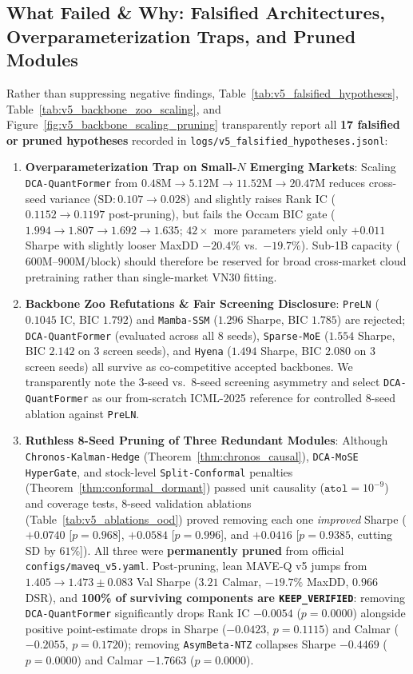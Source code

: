 \documentclass[11pt]{article}
\begin{document}
\subsection{What Failed \& Why: Falsified Architectures, Overparameterization Traps, and Pruned Modules}
\label{sec:v5_falsifications}
Rather than suppressing negative findings, Table~\ref{tab:v5_falsified_hypotheses}, Table~\ref{tab:v5_backbone_zoo_scaling}, and Figure~\ref{fig:v5_backbone_scaling_pruning} transparently report all \textbf{17 falsified or pruned hypotheses} recorded in \texttt{logs/v5\_falsified\_hypotheses.jsonl}:
\begin{enumerate}[leftmargin=1.4em]
  \item \textbf{Overparameterization Trap on Small-$N$ Emerging Markets}: Scaling \texttt{DCA-QuantFormer} from $0.48\text{M} \to 5.12\text{M} \to 11.52\text{M} \to 20.47\text{M}$ reduces cross-seed variance ($\text{SD}: 0.107 \to 0.028$) and slightly raises Rank IC ($0.1152 \to 0.1197$ post-pruning), but fails the Occam BIC gate ($1.994 \to 1.807 \to 1.692 \to 1.635$; $42\times$ more parameters yield only $+0.011$ Sharpe with slightly looser MaxDD $-20.4\%$ vs.\ $-19.7\%$). Sub-1B capacity ($600\text{M}$--$900\text{M}/\text{block}$) should therefore be reserved for broad cross-market cloud pretraining rather than single-market VN30 fitting.
  \item \textbf{Backbone Zoo Refutations \& Fair Screening Disclosure}: \texttt{PreLN} ($0.1045$ IC, BIC $1.792$) and \texttt{Mamba-SSM} ($1.296$ Sharpe, BIC $1.785$) are rejected; \texttt{DCA-QuantFormer} (evaluated across all 8 seeds), \texttt{Sparse-MoE} ($1.554$ Sharpe, BIC $2.142$ on 3 screen seeds), and \texttt{Hyena} ($1.494$ Sharpe, BIC $2.080$ on 3 screen seeds) all survive as co-competitive accepted backbones. We transparently note the 3-seed vs.\ 8-seed screening asymmetry and select \texttt{DCA-QuantFormer} as our from-scratch ICML-2025 reference for controlled 8-seed ablation against \texttt{PreLN}.
  \item \textbf{Ruthless 8-Seed Pruning of Three Redundant Modules}: Although \texttt{Chronos-Kalman-Hedge} (Theorem~\ref{thm:chronos_causal}), \texttt{DCA-MoSE HyperGate}, and stock-level \texttt{Split-Conformal} penalties \citep{angelopoulos2024conformal} (Theorem~\ref{thm:conformal_dormant}) passed unit causality ($\texttt{atol}=10^{-9}$) and coverage tests, 8-seed validation ablations (Table~\ref{tab:v5_ablations_ood}) proved removing each one \emph{improved} Sharpe ($+0.0740$ [$p=0.968$], $+0.0584$ [$p=0.996$], and $+0.0416$ [$p=0.9385$, cutting SD by $61\%$]). All three were \textbf{permanently pruned} from official \texttt{configs/maveq\_v5.yaml}. Post-pruning, lean MAVE-Q v5 jumps from $1.405 \to 1.473 \pm 0.083$ Val Sharpe ($3.21$ Calmar, $-19.7\%$ MaxDD, $0.966$ DSR), and \textbf{100\% of surviving components are \texttt{KEEP\_VERIFIED}}: removing \texttt{DCA-QuantFormer} significantly drops Rank IC $-0.0054$ ($p=0.0000$) alongside positive point-estimate drops in Sharpe ($-0.0423$, $p=0.1115$) and Calmar ($-0.2055$, $p=0.1720$); removing \texttt{AsymBeta-NTZ} collapses Sharpe $-0.4469$ ($p=0.0000$) and Calmar $-1.7663$ ($p=0.0000$).
\end{enumerate}
\end{document}
